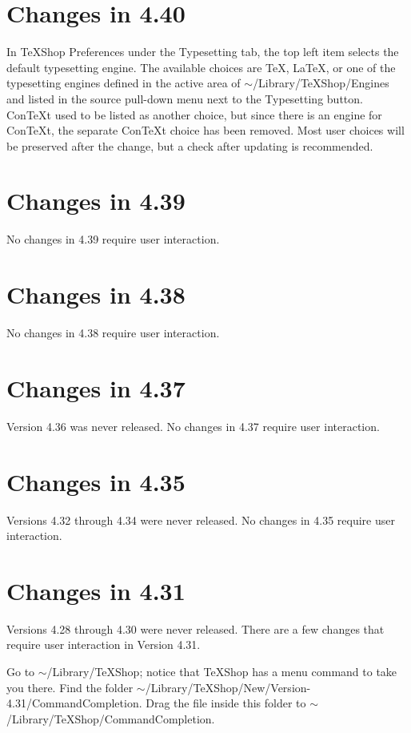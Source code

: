 \documentclass[11pt, oneside]{amsart}
\begin{document}
\section{Changes in 4.40}

In TeXShop Preferences under the Typesetting tab, the top left item selects the default typesetting engine. The available choices are TeX, LaTeX, or one of the typesetting engines defined in the active area of $\sim$/Library/TeXShop/Engines and listed in the source pull-down menu next to the Typesetting button.  ConTeXt used to be listed as another choice, but since there is an engine for ConTeXt, the separate ConTeXt choice has been removed. Most user choices will be preserved after the change, but a check after updating is recommended.


\section{Changes in 4.39}

No changes in 4.39 require user interaction.

\section{Changes in 4.38}

No changes in 4.38 require user interaction.

\section{Changes in 4.37}

Version 4.36 was never released. No changes in 4.37 require user interaction.


\section{Changes in 4.35}

Versions 4.32 through 4.34 were never released. No changes in 4.35 require user interaction.

\section{Changes in 4.31}

Versions 4.28 through 4.30 were never released. There are a few changes that require user interaction in Version 4.31. 

Go to
$\sim$/Library/TeXShop; notice that TeXShop has a menu command to take you there. Find the folder
$\sim$/Library/TeXShop/New/Version-4.31/CommandCompletion. Drag the file inside this folder to $\sim$/Library/TeXShop/CommandCompletion.
\end{document}
